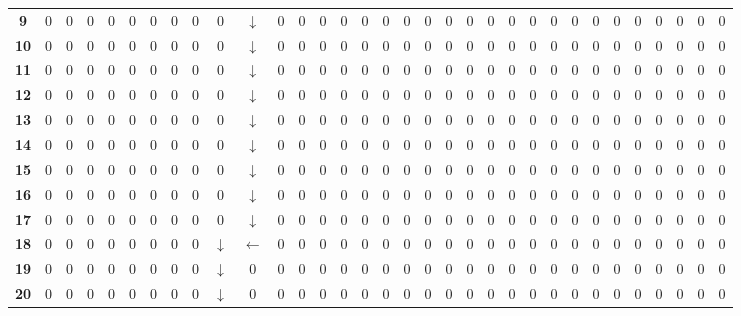 \documentclass[Main]{subfiles}
\begin{document}
\begin{table}[H]
{\begin{tabular}{ccccccccccccccccccccccccccccccccc}
			\textbf{ 9} &  0 &  0 &  0 &  0 &  0 &  0 &  0 &  0 &  0 &  $\downarrow$ &  0 &  0 &  0 &  0 &  0 &  0 &  0 &  0 &  0 &  0 &  0 &  0 &  0 &  0 &  0 &  0 &  0 &  0 &  0 &  0 &  0 &  0 \\
			\textbf{10} &  0 &  0 &  0 &  0 &  0 &  0 &  0 &  0 &  0 &  $\downarrow$ &  0 &  0 &  0 &  0 &  0 &  0 &  0 &  0 &  0 &  0 &  0 &  0 &  0 &  0 &  0 &  0 &  0 &  0 &  0 &  0 &  0 &  0 \\
			\textbf{11} &  0 &  0 &  0 &  0 &  0 &  0 &  0 &  0 &  0 &  $\downarrow$ &  0 &  0 &  0 &  0 &  0 &  0 &  0 &  0 &  0 &  0 &  0 &  0 &  0 &  0 &  0 &  0 &  0 &  0 &  0 &  0 &  0 &  0 \\
			\textbf{12} &  0 &  0 &  0 &  0 &  0 &  0 &  0 &  0 &  0 &  $\downarrow$ &  0 &  0 &  0 &  0 &  0 &  0 &  0 &  0 &  0 &  0 &  0 &  0 &  0 &  0 &  0 &  0 &  0 &  0 &  0 &  0 &  0 &  0 \\
			\textbf{13} &  0 &  0 &  0 &  0 &  0 &  0 &  0 &  0 &  0 &  $\downarrow$ &  0 &  0 &  0 &  0 &  0 &  0 &  0 &  0 &  0 &  0 &  0 &  0 &  0 &  0 &  0 &  0 &  0 &  0 &  0 &  0 &  0 &  0 \\
			\textbf{14} &  0 &  0 &  0 &  0 &  0 &  0 &  0 &  0 &  0 &  $\downarrow$ &  0 &  0 &  0 &  0 &  0 &  0 &  0 &  0 &  0 &  0 &  0 &  0 &  0 &  0 &  0 &  0 &  0 &  0 &  0 &  0 &  0 &  0 \\
			\textbf{15} &  0 &  0 &  0 &  0 &  0 &  0 &  0 &  0 &  0 &  $\downarrow$ &  0 &  0 &  0 &  0 &  0 &  0 &  0 &  0 &  0 &  0 &  0 &  0 &  0 &  0 &  0 &  0 &  0 &  0 &  0 &  0 &  0 &  0 \\
			\textbf{16} &  0 &  0 &  0 &  0 &  0 &  0 &  0 &  0 &  0 &  $\downarrow$ &  0 &  0 &  0 &  0 &  0 &  0 &  0 &  0 &  0 &  0 &  0 &  0 &  0 &  0 &  0 &  0 &  0 &  0 &  0 &  0 &  0 &  0 \\
			\textbf{17} &  0 &  0 &  0 &  0 &  0 &  0 &  0 &  0 &  0 &  $\downarrow$ &  0 &  0 &  0 &  0 &  0 &  0 &  0 &  0 &  0 &  0 &  0 &  0 &  0 &  0 &  0 &  0 &  0 &  0 &  0 &  0 &  0 &  0 \\
			\textbf{18} &  0 &  0 &  0 &  0 &  0 &  0 &  0 &  0 &  $\downarrow$ &  $\leftarrow$ &  0 &  0 &  0 &  0 &  0 &  0 &  0 &  0 &  0 &  0 &  0 &  0 &  0 &  0 &  0 &  0 &  0 &  0 &  0 &  0 &  0 &  0 \\
			\textbf{19} &  0 &  0 &  0 &  0 &  0 &  0 &  0 &  0 &  $\downarrow$ &  0 &  0 &  0 &  0 &  0 &  0 &  0 &  0 &  0 &  0 &  0 &  0 &  0 &  0 &  0 &  0 &  0 &  0 &  0 &  0 &  0 &  0 &  0 \\
			\textbf{20} &  0 &  0 &  0 &  0 &  0 &  0 &  0 &  0 &  $\downarrow$ &  0 &  0 &  0 &  0 &  0 &  0 &  0 &  0 &  0 &  0 &  0 &  0 &  0 &  0 &  0 &  0 &  0 &  0 &  0 &  0 &  0 &  0 &  0 \\

\end{tabular}}
\end{table}
\end{document}
